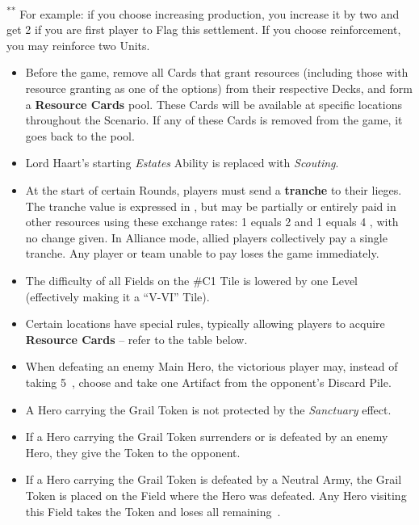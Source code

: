 \begin{multicols*}{2}
\begin{table*}[b!]
  \label{fn:bonus}
  \footnotesize{\textsuperscript{**} For example: if you choose increasing  production, you increase it by two and get 2  if you are first player to Flag this settlement. If you choose reinforcement, you may reinforce two Units.}
\end{table*}

\begin{itemize}
  \item Before the game, remove all Cards that grant resources (including those with resource granting as one of the options) from their respective Decks, and form a \textbf{Resource Cards} pool. These Cards will be available at specific locations throughout the Scenario. If any of these Cards is removed from the game, it goes back to the pool.
  \item Lord Haart's starting \textit{Estates} Ability is replaced with \textit{Scouting}.
  \item At the start of certain Rounds, players must send a \textbf{tranche} to their lieges. The tranche value is expressed in , but may be partially or entirely paid in other resources using these exchange rates: 1  equals 2  and 1  equals 4 , with no change given. In Alliance mode, allied players collectively pay a single tranche. Any player or team unable to pay loses the game immediately.
  \item The difficulty of all Fields on the \#C1 Tile is lowered by one Level (effectively making it a ``V-VI'' Tile).
  \item Certain locations have special rules, typically allowing players to acquire \textbf{Resource Cards} -- refer to the table below.
  \item When defeating an enemy Main Hero, the victorious player may, instead of taking \mbox{5 }, choose and take one Artifact from the opponent's Discard Pile.
  \item A Hero carrying the Grail Token is not protected by the \textit{Sanctuary} effect.
  \item If a Hero carrying the Grail Token surrenders or is defeated by an enemy Hero, they give the Token to the opponent.
  \item If a Hero carrying the Grail Token is defeated by a Neutral Army, the Grail Token is placed on the Field where the Hero was defeated. Any Hero visiting this Field takes the Token and loses all remaining~.
\end{itemize}


\end{multicols*}
